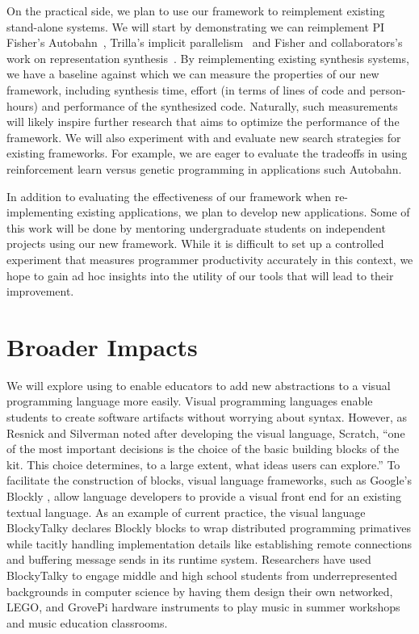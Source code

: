 On the practical side, we plan to use our framework to reimplement
existing stand-alone systems.  We will start by demonstrating we can
reimplement PI Fisher's Autobahn~\cite{autobahn}, Trilla's implicit 
parallelism~\cite{implicit-parallel} and Fisher and collaborators's work on 
representation synthesis~\cite{implicit-parallel}.  
By reimplementing existing synthesis
systems, we have a baseline against which we can measure the properties
of our new framework, including synthesis time, effort (in terms of lines
of code and person-hours) and performance of the synthesized code.  Naturally,
such measurements will likely inspire further research that aims to
optimize the performance of the framework.   We will also experiment
with and evaluate new search strategies for existing frameworks.  For
example, we are eager to evaluate the tradeoffs in using reinforcement
learn versus genetic programming in applications such Autobahn.

In addition to evaluating the effectiveness of our framework when
re-implementing existing applications, we plan to develop new
applications.  Some of this work will be done by mentoring undergraduate
students on independent projects using our new framework.  While it is
difficult to set up a controlled experiment that measures programmer
productivity accurately in this context, we hope to gain ad hoc
insights into the utility of our tools that will lead to their improvement.

\section{Broader Impacts}
\label{sec:impact}




We will explore using \rasps to enable educators to add new
abstractions to a visual programming language more easily. Visual programming
languages enable students to create software artifacts without
worrying about syntax.
However, as Resnick and Silverman noted after developing the visual language,
Scratch\cite{Scratch}, ``one of the most important
decisions is the choice of the basic building blocks of the
kit. This choice determines, to a large extent, what ideas
users can explore.'' 
To facilitate the construction of blocks,
visual language frameworks, such
as Google's Blockly \cite{Blocks,BlocklyApps}, allow language
developers to
provide a visual front end for an existing textual language.
As an example of current practice, the visual
language BlockyTalky\cite{BlockyTalky} declares Blockly blocks to wrap distributed
programming primatives while tacitly handling implementation details like establishing
remote connections and buffering message sends in its runtime system.
Researchers have used BlockyTalky to engage middle and high school students
from underrepresented backgrounds in computer science by having them
design their own networked, LEGO, and GrovePi hardware instruments to play music
in summer workshops and music education classrooms.

